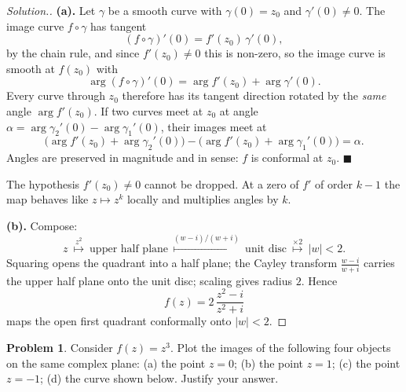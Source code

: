 \documentclass[11pt,a4paper]{article}
\theoremstyle{definition}
\newtheorem{problemx}{Problem}[section]
\newenvironment{problem}{\begin{problemx}}{\end{problemx}}
\newenvironment{solution}
  {\renewcommand{\qedsymbol}{}\begin{proof}[\textit{Solution}.]}
  {\end{proof}}
\begin{document}
\begin{solution}
\textbf{(a).} Let $\gamma$ be a smooth curve with $\gamma(0) = z_0$ and
$\gamma'(0) \neq 0$. The image curve $f \circ \gamma$ has tangent
$$\left(f\circ\gamma\right)'(0) = f'(z_0)\,\gamma'(0),$$
by the chain rule, and since $f'(z_0) \neq 0$ this is non-zero, so the image curve
is smooth at $f(z_0)$ with
$$\arg\left(f\circ\gamma\right)'(0)
= \arg f'(z_0) + \arg \gamma'(0).$$
Every curve through $z_0$ therefore has its tangent direction rotated by the
\emph{same} angle $\arg f'(z_0)$. If two curves meet at $z_0$ at angle
$\alpha = \arg\gamma_2'(0) - \arg\gamma_1'(0)$, their images meet at
$$\big(\arg f'(z_0) + \arg\gamma_2'(0)\big)
- \big(\arg f'(z_0) + \arg\gamma_1'(0)\big) = \alpha .$$
Angles are preserved in magnitude and in sense: $f$ is conformal at $z_0$.
$\blacksquare$

The hypothesis $f'(z_0)\neq 0$ cannot be dropped. At a zero of $f'$ of order
$k-1$ the map behaves like $z \mapsto z^{k}$ locally and multiplies angles by
$k$.

\textbf{(b).} Compose:
$$z \ \overset{z^2}{\longmapsto}\ \text{upper half plane}
\ \overset{(w-i)/(w+i)}{\longmapsto}\ \text{unit disc}
\ \overset{\times 2}{\longmapsto}\ \left|w\right| < 2 .$$
Squaring opens the quadrant into a half plane; the Cayley transform
$\frac{w-i}{w+i}$ carries the upper half plane onto the unit disc; scaling gives
radius $2$. Hence
$$\boxed{f(z) = 2\,\frac{z^2 - i}{z^2 + i}}$$
maps the open first quadrant conformally onto $\left|w\right| < 2$.
\end{solution}


\begin{problem}
Consider $f(z) = z^{3}$. Plot the images of the following four objects on the
same complex plane: (a) the point $z = 0$; (b) the point $z = 1$; (c) the point
$z = -1$; (d) the curve shown below. Justify your answer.

\begin{figure}[H]
\centering
\end{figure}
\end{problem}
\end{document}
